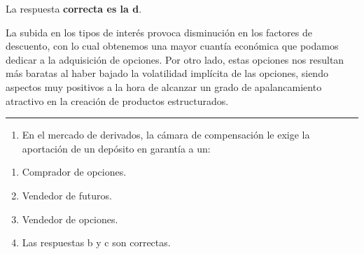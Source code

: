 \documentclass[
  letterpaper,
  DIV=11,
  numbers=noendperiod]{scrreprt}
\providecommand{\tightlist}{%
  \setlength{\itemsep}{0pt}\setlength{\parskip}{0pt}}\usepackage{longtable,booktabs,array}
\begin{document}
\begin{tcolorbox}[enhanced jigsaw, left=2mm, opacityback=0, colback=white, breakable, arc=.35mm, bottomrule=.15mm, rightrule=.15mm, toprule=.15mm, leftrule=.75mm, colframe=quarto-callout-tip-color-frame]
\begin{minipage}[t]{5.5mm}
\textcolor{quarto-callout-tip-color}{\faLightbulb}
\end{minipage}%
\begin{minipage}[t]{\textwidth - 5.5mm}

La respuesta \textbf{correcta es la d}.

La subida en los tipos de interés provoca disminución en los factores de
descuento, con lo cual obtenemos una mayor cuantía económica que podamos
dedicar a la adquisición de opciones. Por otro lado, estas opciones nos
resultan más baratas al haber bajado la volatilidad implícita de las
opciones, siendo aspectos muy positivos a la hora de alcanzar un grado
de apalancamiento atractivo en la creación de productos estructurados.

\end{minipage}%
\end{tcolorbox}

\begin{center}\rule{0.5\linewidth}{0.5pt}\end{center}

\begin{enumerate}
\def\labelenumi{\arabic{enumi}.}
\setcounter{enumi}{31}
\tightlist
\item
  En el mercado de derivados, la cámara de compensación le exige la
  aportación de un depósito en garantía a un:
\end{enumerate}

\begin{enumerate}
\def\labelenumi{\alph{enumi})}
\item
  Comprador de opciones.
\item
  Vendedor de futuros.
\item
  Vendedor de opciones.
\item
  Las respuestas b y c son correctas.
\end{enumerate}
\end{document}
